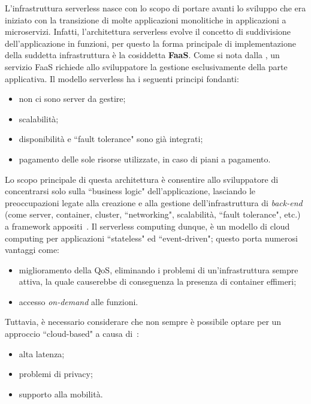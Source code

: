 \documentclass[12pt,a4paper,openany,twoside]{book}
\begin{document}
L'infrastruttura serverless nasce con lo scopo di portare avanti lo sviluppo che era iniziato con la transizione di molte applicazioni monolitiche in applicazioni a microservizi. Infatti, l'architettura serverless evolve il concetto di suddivisione dell'applicazione in funzioni, per questo la forma principale di implementazione della suddetta infrastruttura è la cosiddetta \textbf{\ac{FaaS}}. Come si nota dalla , un servizio \ac{FaaS} richiede allo sviluppatore la gestione esclusivamente della parte applicativa. Il modello serverless ha i seguenti principi fondanti:
\begin{itemize}
    \item non ci sono server da gestire;
    
    \item scalabilità;
    
    \item disponibilità e ``fault tolerance" sono già integrati;
    
    \item pagamento delle sole risorse utilizzate, in caso di piani a pagamento.
\end{itemize}
Lo scopo principale di questa architettura è consentire allo sviluppatore di concentrarsi solo sulla ``business logic" dell'applicazione, lasciando le preoccupazioni legate alla creazione e alla gestione dell'infrastruttura di \textit{back-end} (come server, container, cluster, ``networking", scalabilità, ``fault tolerance", etc.) a framework appositi~\cite{Mohanty2018}.
Il serverless computing dunque, è un modello di cloud computing per applicazioni ``stateless" ed ``event-driven"; questo porta numerosi vantaggi come:
\begin{itemize}
    \item miglioramento della \ac{QoS}, eliminando i problemi di un'infrastruttura sempre attiva, la quale causerebbe di conseguenza la presenza di container effimeri;
    
    \item accesso \textit{on-demand} alle funzioni.
\end{itemize}
Tuttavia, è necessario considerare che non sempre è possibile optare per un approccio ``cloud-based" a causa di~\cite{Palade2019}:
\begin{itemize}
    \item alta latenza;
    
    \item problemi di privacy;
    
    \item supporto alla mobilità.
\end{itemize}
\end{document}
